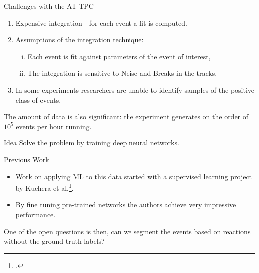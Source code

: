 \documentclass[notes]{beamer}
\begin{document}

\begin{frame}[t]{Challenges with the AT-TPC}
	\begin{enumerate}[I]
		\item Expensive integration - for each event a fit is computed.
		\item Assumptions of the integration technique: 
			\begin{enumerate}[(i)]
				\item Each event is fit against parameters of the event of interest,
				\item The integration is sensitive to Noise and Breaks in the tracks.
			\end{enumerate}
		\item In some experiments researchers are unable to identify samples of the positive class of events.
	\end{enumerate}
	The amount of data is also significant: the experiment generates on the order of $10^5$ events per hour running.
	\begin{block}{Idea}
		Solve the problem by training deep neural networks.
	\end{block}
\end{frame}

\begin{frame}[t]{Previous Work}
	\begin{itemize}
		\item Work on applying ML to this data started with a supervised learning project by Kuchera et al.\footcite{Kuchera2019}.
		\item By fine tuning pre-trained networks the authors achieve very impressive performance.
	\end{itemize}
	One of the open questions is then, can we segment the events based on reactions without the ground truth labels?
\end{frame}
\end{document}

